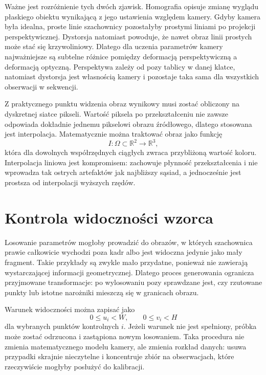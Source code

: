 \documentclass[12pt,a4paper]{report}
\begin{document}
Ważne jest rozróżnienie tych dwóch zjawisk. Homografia opisuje zmianę wyglądu płaskiego
obiektu wynikającą z jego ustawienia względem kamery. Gdyby kamera była idealna, proste linie
szachownicy pozostałyby prostymi liniami po projekcji perspektywicznej. Dystorsja natomiast
powoduje, że nawet obraz linii prostych może stać się krzywoliniowy. Dlatego dla uczenia
parametrów kamery najważniejsze są subtelne różnice pomiędzy deformacją perspektywiczną
a deformacją optyczną. Perspektywa zależy od pozy tablicy w danej klatce, natomiast dystorsja
jest własnością kamery i pozostaje taka sama dla wszystkich obserwacji w sekwencji.

Z praktycznego punktu widzenia obraz wynikowy musi zostać obliczony na dyskretnej siatce pikseli.
Wartość piksela po przekształceniu nie zawsze odpowiada dokładnie jednemu pikselowi obrazu
źródłowego, dlatego stosowana jest interpolacja. Matematycznie można traktować obraz jako
funkcję
\begin{equation}
    I: \Omega \subset \mathbb{R}^2 \rightarrow \mathbb{R}^3,
\end{equation}
która dla dowolnych współrzędnych ciągłych zwraca przybliżoną wartość koloru. Interpolacja
liniowa jest kompromisem: zachowuje płynność przekształcenia i nie wprowadza tak ostrych
artefaktów jak najbliższy sąsiad, a jednocześnie jest prostsza od interpolacji wyższych rzędów.

\section{Kontrola widoczności wzorca}
Losowanie parametrów mogłoby prowadzić do obrazów, w których szachownica prawie całkowicie
wychodzi poza kadr albo jest widoczna jedynie jako mały fragment. Takie przykłady są zwykle
mało przydatne, ponieważ nie zawierają wystarczającej informacji geometrycznej. Dlatego proces
generowania ogranicza przyjmowane transformacje: po wylosowaniu pozy sprawdzane jest, czy
rzutowane punkty lub istotne narożniki mieszczą się w granicach obrazu.

Warunek widoczności można zapisać jako
\begin{equation}
    0 \leq u_i < W,
    \qquad
    0 \leq v_i < H
\end{equation}
dla wybranych punktów kontrolnych $i$. Jeżeli warunek nie jest spełniony, próbka może zostać
odrzucona i zastąpiona nowym losowaniem. Taka procedura nie zmienia matematycznego modelu
kamery, ale zmienia rozkład danych: usuwa przypadki skrajnie nieczytelne i koncentruje zbiór
na obserwacjach, które rzeczywiście mogłyby posłużyć do kalibracji.
\end{document}

